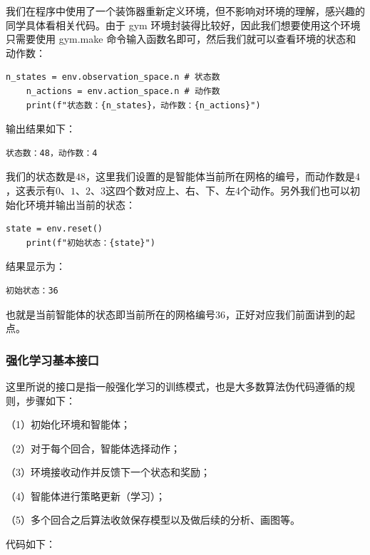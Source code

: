 我们在程序中使用了一个装饰器重新定义环境，但不影响对环境的理解，感兴趣的同学具体看相关代码。由于 gym 环境封装得比较好，因此我们想要使用这个环境只需要使用 gym.make 命令输入函数名即可，然后我们就可以查看环境的状态和动作数：

\begin{lstlisting}[style=Python]
    n_states = env.observation_space.n # 状态数
    n_actions = env.action_space.n # 动作数
    print(f"状态数：{n_states}，动作数：{n_actions}")
\end{lstlisting}

输出结果如下：
\begin{lstlisting}[language=sh,basicstyle=\zihao{-5}\ttfamily]
    状态数：48，动作数：4
\end{lstlisting}

我们的状态数是$48$，这里我们设置的是智能体当前所在网格的编号，而动作数是$4$，这表示有$0$、$1$、$2$、$3$这四个数对应上、右、下、左4个动作。另外我们也可以初始化环境并输出当前的状态：

\begin{lstlisting}[style=Python]
    state = env.reset()
    print(f"初始状态：{state}")
\end{lstlisting}

结果显示为：

\begin{lstlisting}[language=sh,basicstyle=\zihao{-5}\ttfamily] 
    初始状态：36
\end{lstlisting}

也就是当前智能体的状态即当前所在的网格编号$36$，正好对应我们前面讲到的起点。

\subsubsection{强化学习基本接口}

这里所说的接口是指一般强化学习的训练模式，也是大多数算法伪代码遵循的规则，步骤如下：

（1）初始化环境和智能体；

（2）对于每个回合，智能体选择动作；

（3）环境接收动作并反馈下一个状态和奖励；

（4）智能体进行策略更新（学习）；

（5）多个回合之后算法收敛保存模型以及做后续的分析、画图等。

代码如下：

